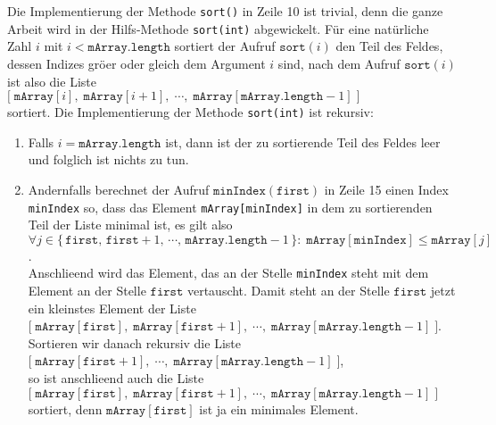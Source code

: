 Die Implementierung der Methode \texttt{sort()} in Zeile 10 ist trivial, denn die ganze
Arbeit wird in der Hilfs-Methode \texttt{sort(int)} abgewickelt.  F\"ur eine 
nat\"urliche Zahl $i$ mit $i < \mathtt{mArray.length}$ sortiert der Aufruf 
 $\texttt{sort}(i)$ 
den Teil des Feldes, dessen Indizes gr\"o\3er oder gleich dem Argument $i$ sind, nach dem
Aufruf $\mathtt{sort}(i)$ ist also die Liste \\[0.2cm]
\hspace*{1.3cm} 
$\bigl[\;\mathtt{mArray}[i],\;\mathtt{mArray}[i+1],\;\cdots,\;\mathtt{mArray}[\mathtt{mArray.length}-1] \;\bigr]$
\\[0.2cm]
sortiert.  Die Implementierung der Methode \texttt{sort(int)} ist rekursiv:
\begin{enumerate}
\item Falls $i = \mathtt{mArray.length}$ ist, dann ist der zu sortierende Teil des 
      Feldes leer und folglich ist nichts zu tun.
\item Andernfalls berechnet der Aufruf $\texttt{minIndex}(\mathtt{first})$ in Zeile 15 einen Index
      \texttt{minIndex} so, dass das Element \texttt{mArray[minIndex]} in dem zu
      sortierenden Teil der Liste minimal ist, es gilt also \\[0.2cm]
      \hspace*{1.3cm} 
      $\forall j \in \bigl\{\, \mathtt{first},\, \mathtt{first}+1,\, \cdots,\, \texttt{mArray.length} -1\, \} \colon\;
       \texttt{mArray}[\texttt{minIndex}] \leq \texttt{mArray}[j]$. \\[0.2cm]
      Anschlie\3end wird das Element, das an der Stelle \texttt{minIndex} steht mit dem
      Element an der Stelle $\texttt{first}$ vertauscht.  Damit steht an der Stelle $\texttt{first}$ jetzt ein
      kleinstes Element der Liste \\[0.2cm]
      \hspace*{1.3cm} $\bigl[\;\mathtt{mArray}[\texttt{first}],\;\mathtt{mArray}[\texttt{first}+1],\;\cdots,\;\mathtt{mArray}[\mathtt{mArray.length}-1] \;\bigr]$.
      \\[0.2cm]
      Sortieren wir danach rekursiv die Liste \\[0.2cm]
      \hspace*{1.3cm} $\bigl[\;\mathtt{mArray}[\texttt{first}+1],\;\cdots,\;\mathtt{mArray}[\mathtt{mArray.length}-1] \;\bigr]$,
      \\[0.2cm]
      so ist anschlie\3end auch die Liste \\[0.2cm]
      \hspace*{1.3cm}
      $\bigl[\;\mathtt{mArray}[\texttt{first}],\;\mathtt{mArray}[\texttt{first}+1],\;\cdots,\;\mathtt{mArray}[\mathtt{mArray.length}-1] \;\bigr]$
      \\[0.2cm]
      sortiert, denn $\texttt{mArray}[\texttt{first}]$ ist ja ein minimales Element.
\end{enumerate}
